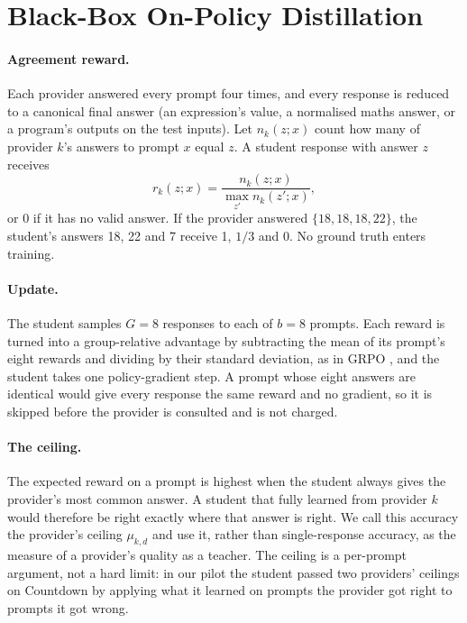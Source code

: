 \section{Black-Box On-Policy Distillation}
\label{ca:sec:opd}

\paragraph{Agreement reward.} Each provider answered every prompt four times, and every
response is reduced to a canonical final answer (an expression's value, a normalised maths
answer, or a program's outputs on the test inputs). Let $n_k(z; x)$ count how many of
provider $k$'s answers to prompt $x$ equal $z$. A student response with answer $z$ receives
\[
  r_k(z; x) = \frac{n_k(z; x)}{\max_{z'} n_k(z'; x)},
\]
or 0 if it has no valid answer. If the provider answered $\{18, 18, 18, 22\}$, the student's
answers 18, 22 and 7 receive 1, $1/3$ and 0. No ground truth enters training.

\paragraph{Update.} The student samples $G = 8$ responses to each of $b = 8$ prompts. Each
reward is turned into a group-relative advantage by subtracting the mean of its prompt's
eight rewards and dividing by their standard deviation, as in GRPO
\autocite{shao_deepseekmath_grpo_2024}, and the student takes one policy-gradient step.
A prompt whose eight answers are identical would give every response the same reward and
no gradient, so it is skipped before the provider is consulted and is not charged.

\paragraph{The ceiling.} The expected reward on a prompt is highest when the student always
gives the provider's most common answer. A student that fully learned from provider $k$
would therefore be right exactly where that answer is right. We call this accuracy the
provider's ceiling $\mu_{k,d}$ and use it, rather than single-response accuracy, as the
measure of a provider's quality as a teacher. The ceiling is a per-prompt argument, not a
hard limit: in our pilot the student passed two providers' ceilings on Countdown by applying
what it learned on prompts the provider got right to prompts it got wrong.

